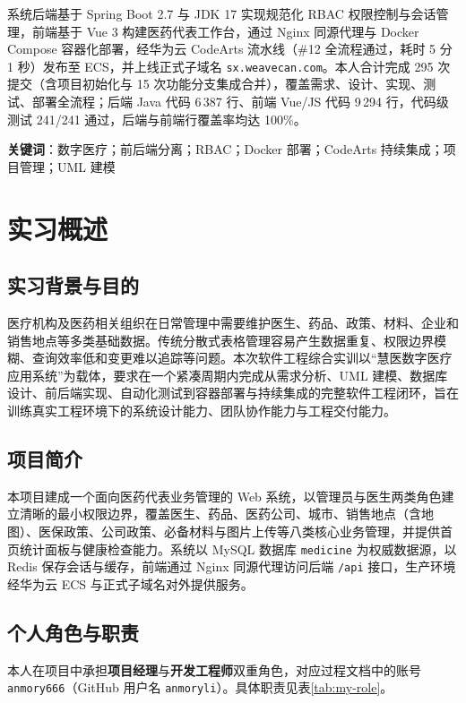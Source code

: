 \documentclass[UTF8,a4paper,12pt,openany,fontset=windows]{ctexrep}
\begin{document}
系统后端基于 Spring Boot 2.7 与 JDK 17 实现规范化 RBAC 权限控制与会话管理，前端基于 Vue 3 构建医药代表工作台，通过 Nginx 同源代理与 Docker Compose 容器化部署，经华为云 CodeArts 流水线（\#12 全流程通过，耗时 5 分 1 秒）发布至 ECS，并上线正式子域名 \texttt{sx.weavecan.com}。本人合计完成 295 次提交（含项目初始化与 15 次功能分支集成合并），覆盖需求、设计、实现、测试、部署全流程；后端 Java 代码 6\,387 行、前端 Vue/JS 代码 9\,294 行，代码级测试 241/241 通过，后端与前端行覆盖率均达 100\%。

\textbf{关键词}：数字医疗；前后端分离；RBAC；Docker 部署；CodeArts 持续集成；项目管理；UML 建模

\tableofcontents
\cleardoublepage
{}

\chapter{实习概述}

\section{实习背景与目的}
医疗机构及医药相关组织在日常管理中需要维护医生、药品、政策、材料、企业和销售地点等多类基础数据。传统分散式表格管理容易产生数据重复、权限边界模糊、查询效率低和变更难以追踪等问题。本次软件工程综合实训以“慧医数字医疗应用系统”为载体，要求在一个紧凑周期内完成从需求分析、UML 建模、数据库设计、前后端实现、自动化测试到容器部署与持续集成的完整软件工程闭环，旨在训练真实工程环境下的系统设计能力、团队协作能力与工程交付能力。

\section{项目简介}
本项目建成一个面向医药代表业务管理的 Web 系统，以管理员与医生两类角色建立清晰的最小权限边界，覆盖医生、药品、医药公司、城市、销售地点（含地图）、医保政策、公司政策、必备材料与图片上传等八类核心业务管理，并提供首页统计面板与健康检查能力。系统以 MySQL 数据库 \texttt{medicine} 为权威数据源，以 Redis 保存会话与缓存，前端通过 Nginx 同源代理访问后端 \texttt{/api} 接口，生产环境经华为云 ECS 与正式子域名对外提供服务。

\section{个人角色与职责}
本人在项目中承担\textbf{项目经理}与\textbf{开发工程师}双重角色，对应过程文档中的账号 \texttt{anmory666}（GitHub 用户名 \texttt{anmoryli}）。具体职责见表\ref{tab:my-role}。
\end{document}
